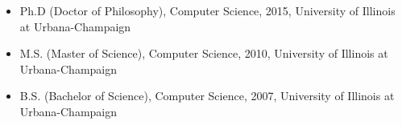 \begin{itemize}[itemsep=-0.1em]
    \item Ph.D (Doctor of Philosophy), Computer Science, 2015, University of Illinois at Urbana-Champaign
     \item M.S. (Master of Science), Computer Science, 2010, University of Illinois at Urbana-Champaign

   \item B.S. (Bachelor of Science), Computer Science, 2007, University of Illinois at Urbana-Champaign
\end{itemize}